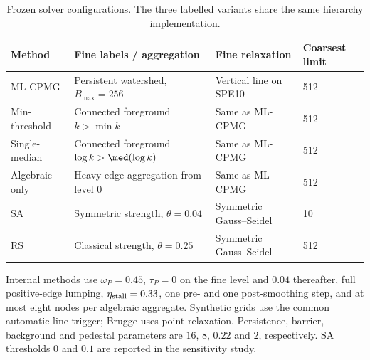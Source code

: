 \begin{table}[!tbp]\centering
\caption{Frozen solver configurations. The three labelled variants share the same hierarchy implementation.}\label{tab:configuration}
\begin{tabular}{llll}
\toprule
Method & Fine labels / aggregation & Fine relaxation & Coarsest limit\\
\midrule
ML-CPMG & Persistent watershed, $B_{\max}=256$ & Vertical line on SPE10 &512\\
Min-threshold & Connected foreground $k>\min k$ & Same as ML-CPMG &512\\
Single-median & Connected foreground $\log k>\med(\log k)$ & Same as ML-CPMG &512\\
Algebraic-only & Heavy-edge aggregation from level 0 & Same as ML-CPMG &512\\
SA & Symmetric strength, $\theta=0.04$ & Symmetric Gauss--Seidel &10\\
RS & Classical strength, $\theta=0.25$ & Symmetric Gauss--Seidel &512\\
\bottomrule
\end{tabular}
\par\smallskip\footnotesize
Internal methods use $\omega_P=0.45$, $\tau_P=0$ on the fine level and $0.04$
thereafter, full positive-edge lumping, $\eta_{\rm stall}=0.33$, one pre- and
one post-smoothing step, and at most eight nodes per algebraic aggregate.
Synthetic grids use the common automatic line trigger; Brugge uses point
relaxation. Persistence, barrier, background and pedestal parameters are
$16$, $8$, $0.22$ and $2$, respectively. SA thresholds $0$ and $0.1$ are
reported in the sensitivity study.\normalsize
\end{table}
